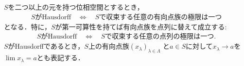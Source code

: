 	\begin{screen}
		\begin{thm}
		\label{thm:Hausdorff_iff_at_most_one_limit}
			$S$を二つ以上の元を持つ位相空間とするとき，
			\begin{align}
				\mbox{$S$がHausdorff} \quad \Longleftrightarrow \quad
				\mbox{$S$で収束する任意の有向点族の極限は一つ}
			\end{align}
			となる．特に，$S$が第一可算性を持てば有向点族を点列に替えて成立する:
			\begin{align}
				\mbox{$S$がHausdorff} \quad \Longleftrightarrow \quad
				\mbox{$S$で収束する任意の点列の極限は一つ}.
				\label{eq:thm_Hausdorff_iff_at_most_one_limit_1}
			\end{align}
			$S$がHausdorffであるとき，$S$上の有向点族$(x_\lambda)_{\lambda \in \Lambda}$
			と$a \in S$に対して$x_\lambda \longrightarrow a$を$\lim x_\lambda = a$とも表記する．
		\end{thm}
	\end{screen}
	
